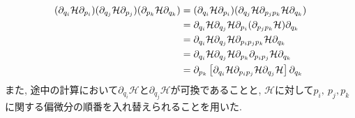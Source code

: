 \begin{align}
  (\partial_{q_{i}} \mathcal{H} \partial_{p_{i}})
  (\partial_{q_{j}} \mathcal{H} \partial_{p_{j}})
  (\partial_{p_{k}} \mathcal{H} \partial_{q_{k}})
  &=
  (\partial_{q_{i}} \mathcal{H} \partial_{p_{i}})
  (\partial_{q_{j}} \mathcal{H} \partial_{p_{j} p_{k}} \mathcal{H} \partial_{q_{k}})
  \notag \\
  &=
  \partial_{q_{i}} \mathcal{H}
  \partial_{q_{j}} \mathcal{H}
  \partial_{p_{i}} (\partial_{p_{j} p_{k}} \mathcal{H})
  \partial_{q_{k}}
  \notag \\
  &=
  \partial_{q_{i}} \mathcal{H}
  \partial_{q_{j}} \mathcal{H}
  \partial_{p_{i} p_{j} p_{k}} \mathcal{H}
  \partial_{q_{k}}
  \notag \\
  &=
  \partial_{q_{i}} \mathcal{H}
  \partial_{q_{j}} \mathcal{H}
  \partial_{p_{k}}
  \partial_{p_{i} p_{j}} \mathcal{H}
  \partial_{q_{k}}
  \notag \\
  &=
  \partial_{p_{k}}
  \left[
    \partial_{q_{i}}       \mathcal{H}
    \partial_{p_{i} p_{j}} \mathcal{H}
    \partial_{q_{j}}       \mathcal{H}
  \right]
  \partial_{q_{k}}
  \notag
\end{align}
また, 途中の計算において$\partial_{q_{i}} \mathcal{H}$と$\partial_{q_{j}} \mathcal{H}$が可換であることと, $\mathcal{H}$に対して$p_{i},~p_{j},p_{k}$に関する偏微分の順番を入れ替えられることを用いた.

